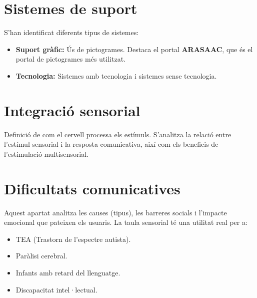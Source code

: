 \section{Sistemes de suport}
S'han identificat diferents tipus de sistemes:
\begin{itemize}
    \item \textbf{Suport gràfic:} Ús de pictogrames. Destaca el portal \textbf{ARASAAC}, que és el portal de pictogrames més utilitzat.
    \item \textbf{Tecnologia:} Sistemes amb tecnologia i sistemes sense tecnologia.
\end{itemize}

\section{Integració sensorial}
Definició de com el cervell processa els estímuls. S'analitza la relació entre l'estímul sensorial i la resposta comunicativa, així com els beneficis de l'estimulació multisensorial.

\begin{center}
\end{center}

\section{Dificultats comunicatives}
Aquest apartat analitza les causes (tipus), les barreres socials i l'impacte emocional que pateixen els usuaris. La taula sensorial té una utilitat real per a:
\begin{itemize}
    \item TEA (Trastorn de l'espectre autista).
    \item Paràlisi cerebral.
    \item Infants amb retard del llenguatge.
    \item Discapacitat intel·lectual.
\end{itemize}
